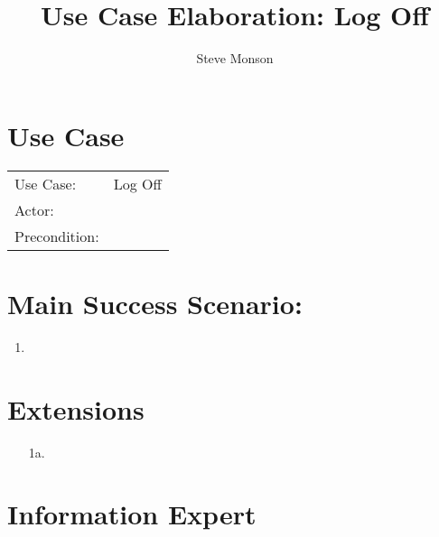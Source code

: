 \documentclass{article}
\title{Use Case Elaboration: Log Off}
\author{ Steve Monson }
\begin{document}
\maketitle


\section*{Use Case}
\begin{tabular}{l l}
Use Case:     & Log Off\\
Actor:        & \\
Precondition: & \\
\end{tabular}


\section*{Main Success Scenario:}

\begin{enumerate}
    \item 

\end{enumerate}

\section*{Extensions}

\begin{itemize}
    \item [1a.]
                            
\end{itemize}


\section*{Information Expert}
\end{document}
